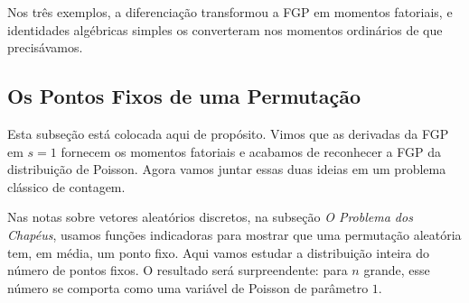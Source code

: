 \documentclass[12pt,portuguese]{article}
\theoremstyle{definition}
\theoremstyle{plainexercise}
\theoremstyle{starredexercise}
\theoremstyle{definition}
\begin{document}
Nos três exemplos, a diferenciação transformou a FGP em momentos fatoriais,
e identidades algébricas simples os converteram nos momentos ordinários de que
precisávamos.

\subsection{Os Pontos Fixos de uma Permutação}
\label{sec:pontos-fixos-fgp}

Esta subseção está colocada aqui de propósito. Vimos que as
derivadas da FGP em $s=1$ fornecem os momentos fatoriais e acabamos de
reconhecer a FGP da distribuição de Poisson. Agora vamos juntar essas duas
ideias em um problema clássico de contagem.

Nas notas sobre vetores aleatórios discretos, na subseção
\emph{O Problema dos Chapéus}, usamos funções indicadoras para mostrar que uma
permutação aleatória tem, em média, um ponto fixo. Aqui vamos estudar a
distribuição inteira do número de pontos fixos. O resultado será surpreendente:
para $n$ grande, esse número se comporta como uma variável de Poisson de
parâmetro $1$.
\end{document}
